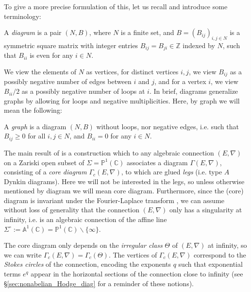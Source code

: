 \documentclass[11pt,a4paper]{amsart}
\numberwithin{equation}{section}
\begin{document}
To give a more precise formulation of this, let us recall and introduce some terminology:

\begin{definition}
A \emph{diagram} is a pair $(N, B)$, where $N$ is a finite set, and $B=(B_{ij})_{i,j\in N}$ is a  symmetric square matrix with integer entries $B_{ij}=B_{ji}\in \mathbb Z$ indexed by $N$, such that $B_{ii}$ is even for any $i\in N$. 
\end{definition}

We view the elements of $N$ as vertices, for distinct vertices $i,j$, we view $B_{ij}$ as a possibly negative number of edges between $i$ and $j$, and for a vertex $i$, we view $B_{ii}/2$ as a possibly negative number of loops at $i$. In brief, diagrams generalize graphs by allowing for loops and negative multiplicities. Here, by graph we will mean the following:

\begin{definition}
A \emph{graph} is a diagram $(N, B)$ without loops, nor negative edges, i.e. such that $B_{ij}\geq 0$ for all $i,j\in N$, and $B_{ii}=0$ for any $i\in N$. 
\end{definition}

The main result of \cite{boalch2020diagrams,doucot2021diagrams} is a construction which to any algebraic connection $(E, \nabla)$ on a Zariski open subset of $\Sigma=\mathbb P^1(\mathbb C)$ associates a diagram $\Gamma(E,\nabla)$, consisting of a \emph{core diagram} $\Gamma_c(E, \nabla)$, to which are glued \emph{legs} (i.e. type $A$ Dynkin diagrams). Here we will not be interested in the legs, so unless otherwise mentioned by diagram we will mean core diagram. Furthermore, since the (core) diagram is invariant under the Fourier-Laplace transform \cite{doucot2021diagrams}, we can assume without loss of generality that the connection $(E,\nabla)$ only has a singularity at infinity, i.e. is an algebraic connection of the affine line $\Sigma^\circ:=\mathbb A^1(\mathbb C)=\mathbb P^1(\mathbb C)\smallsetminus \{\infty\}$. 

The core diagram only depends on the \emph{irregular class} $\Theta$ of $(E,\nabla)$ at infinity, so we can write $\Gamma_c(E,\nabla)=\Gamma_c(\Theta)$. The vertices of $\Gamma_c(E,\nabla)$ correspond to the \emph{Stokes circles} of the connection, encoding the exponents $q$ such that exponential terms $e^q$ appear in the horizontal sections of the connection close to infinity (see §\ref{sec:nonabelian_Hodge_diag} for a reminder of these notions).
\end{document}
